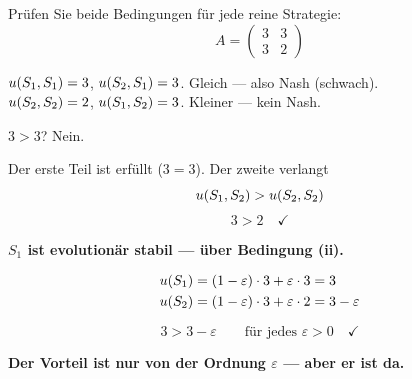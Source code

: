 \begin{aufgabe}
Prüfen Sie beide Bedingungen für jede reine Strategie:
\[ A = \begin{pmatrix} 3 & 3\\ 3 & 2\end{pmatrix} \]

\loesung
{}
 $u(S_1,S_1) = 3$, $u(S_2,S_1) = 3$. Gleich --- also Nash (schwach).\\
 $u(S_2,S_2) = 2$, $u(S_1,S_2) = 3$. Kleiner --- kein Nash.

 $3 > 3$? Nein.

 Der erste Teil ist erfüllt ($3 = 3$). Der zweite verlangt
\[ u(S_1,S_2) > u(S_2,S_2) \]
\[ 3 > 2 \quad \checkmark \]

\begin{center}
\begin{minipage}{0.9\textwidth}
\textbf{$S_1$ ist evolutionär stabil --- über Bedingung (ii).}
\end{minipage}
\end{center}

\begin{center}
\begin{minipage}{0.88\textwidth}
\end{minipage}
\end{center}

\begin{align*}
u(S_1) &= (1-\varepsilon)\cdot3 + \varepsilon\cdot3 = 3\\
u(S_2) &= (1-\varepsilon)\cdot3 + \varepsilon\cdot2 = 3-\varepsilon
\end{align*}

\[ 3 > 3-\varepsilon \qquad\text{für jedes } \varepsilon > 0 \quad \checkmark \]

\begin{center}
\begin{minipage}{0.9\textwidth}
\textbf{Der Vorteil ist nur von der Ordnung $\varepsilon$ --- aber er ist da.}
\end{minipage}
\end{center}


\end{aufgabe}
